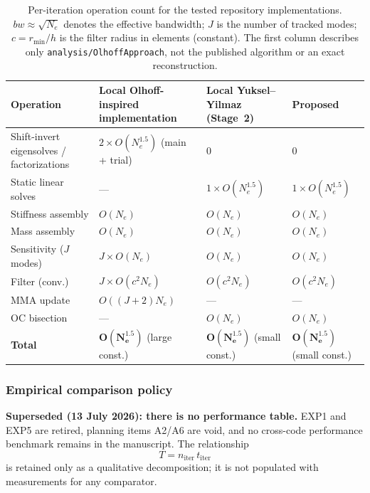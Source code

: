 \documentclass[12pt,a4paper]{article}
\begin{document}
\begin{table}[htbp]
\centering
\caption{Per-iteration operation count for the tested repository
implementations.
$bw \approx \sqrt{N_e}$ denotes the effective bandwidth;
$J$ is the number of tracked modes;
$c = r_{\min}/h$ is the filter radius in elements (constant).  The first
column describes only \texttt{analysis/OlhoffApproach}, not the published
algorithm or an exact reconstruction.}
\label{tab:ops}
\renewcommand\arraystretch{1.2}
\begin{tabularx}{\textwidth}{@{}lXXX@{}}
\toprule
Operation & Local Olhoff-inspired implementation & Local Yuksel--Yilmaz (Stage~2) & Proposed \\
\midrule
Shift-invert eigensolves / factorizations
  & $2 \times O(N_e^{1.5})$ (main + trial)
  & $0$ & $0$ \\
Static linear solves
  & --- & $1 \times O(N_e^{1.5})$ & $1 \times O(N_e^{1.5})$ \\
Stiffness assembly & $O(N_e)$ & $O(N_e)$ & $O(N_e)$ \\
Mass assembly & $O(N_e)$ & $O(N_e)$ & $O(N_e)$ \\
Sensitivity ($J$ modes) & $J \times O(N_e)$ & $O(N_e)$ & $O(N_e)$ \\
Filter (conv.) & $J \times O(c^2 N_e)$ & $O(c^2 N_e)$ & $O(c^2 N_e)$ \\
MMA update & $O((J{+}2)N_e)$ & --- & --- \\
OC bisection & --- & $O(N_e)$ & $O(N_e)$ \\
\midrule
\textbf{Total} & $\boldsymbol{O(N_e^{1.5})}$ (large const.)
               & $\boldsymbol{O(N_e^{1.5})}$ (small const.)
               & $\boldsymbol{O(N_e^{1.5})}$ (small const.) \\
\bottomrule
\end{tabularx}
\end{table}

\subsubsection*{Empirical comparison policy}

\textbf{Superseded (13 July 2026): there is no performance table.}  EXP1 and
EXP5 are retired, planning items A2/A6 are void, and no cross-code performance
benchmark remains in the manuscript.  The relationship
\[
  T = n_{\mathrm{iter}}\,t_{\mathrm{iter}}
\]
is retained only as a qualitative decomposition; it is not populated with
measurements for any comparator.
\end{document}
